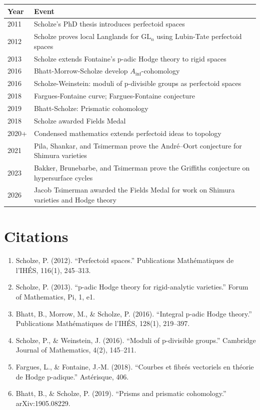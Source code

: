 \begin{tabularx}{\linewidth}{lX}
\toprule
\textbf{Year} & \textbf{Event} \\ \midrule
2011 & Scholze's PhD thesis introduces perfectoid spaces \\ 
2012 & Scholze proves local Langlands for $\text{GL}_n$ using Lubin-Tate perfectoid spaces \\

2013 & Scholze extends Fontaine's p-adic Hodge theory to rigid spaces \\
2016 & Bhatt-Morrow-Scholze develop $A_{\text{inf}}$-cohomology \\

2016 & Scholze-Weinstein: moduli of p-divisible groups as perfectoid spaces \\

2018 & Fargues-Fontaine curve; Fargues-Fontaine conjecture \\

2019 & Bhatt-Scholze: Prismatic cohomology \\

2018 & Scholze awarded Fields Medal \\

2020+ & Condensed mathematics extends perfectoid ideas to topology \\
2021 & Pila, Shankar, and Tsimerman prove the Andr\'e--Oort conjecture for Shimura varieties \\
2023 & Bakker, Brunebarbe, and Tsimerman prove the Griffiths conjecture on hypersurface cycles \\
2026 & Jacob Tsimerman awarded the Fields Medal for work on Shimura varieties and Hodge theory \\
\bottomrule
\end{tabularx}

\section{Citations}

\begin{enumerate}
\item Scholze, P. (2012). ``Perfectoid spaces.'' Publications Mathématiques de l'IHÉS, 116(1), 245--313.
\item Scholze, P. (2013). ``p-adic Hodge theory for rigid-analytic varieties.'' Forum of Mathematics, Pi, 1, e1.
\item Bhatt, B., Morrow, M., \& Scholze, P. (2016). ``Integral p-adic Hodge theory.'' Publications Mathématiques de l'IHÉS, 128(1), 219--397.
\item Scholze, P., \& Weinstein, J. (2016). ``Moduli of p-divisible groups.'' Cambridge Journal of Mathematics, 4(2), 145--211.
\item Fargues, L., \& Fontaine, J.-M. (2018). ``Courbes et fibrés vectoriels en théorie de Hodge p-adique.'' Astérisque, 406.
\item Bhatt, B., \& Scholze, P. (2019). ``Prisms and prismatic cohomology.'' arXiv:1905.08229.
\end{enumerate}
